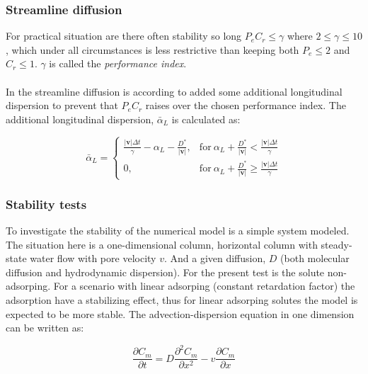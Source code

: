 \documentclass{report}
\begin{document}
\subsubsection{Streamline diffusion}

For practical situation are there often stability so long $P_eC_r\leq
 \gamma$ where $2\leq \gamma \leq 10$, \cite{Perrochet}  which under all
 circumstances is less restrictive than keeping both $P_e\leq 2$ and
 $C_r\leq 1$. $\gamma$ is called the \textit{performance index}.\\
\\
In the streamline diffusion is according to \cite{Perrochet} added
some additional longitudinal dispersion to prevent that $P_eC_r$
raises over the chosen performance index. The additional
longitudinal dispersion, $\bar{\alpha}_L$ is calculated as:

\begin{equation}
\bar{\alpha}_L=\begin{cases} \frac{|\mathbf{v}|\Delta
    t}{\gamma}-\alpha_L-\frac{D^{*}}{|\mathbf{v}|}, & \text{for} \ \alpha_L +
    \frac{D^{*}}{|\mathbf{v}|} < \frac{|\mathbf{v}|\Delta t}{\gamma}
 \\ 0, & \text{for} \ \alpha_L +
    \frac{D^{*}}{|\mathbf{v}|} \geq \frac{|\mathbf{v}|\Delta
    t}{\gamma}\end{cases}
\end{equation}



\subsubsection{Stability tests}

To investigate the stability of the numerical model is a simple system
 modeled. The situation here is a one-dimensional column, horizontal
 column with steady-state water flow with pore velocity $v$. And a given
diffusion, $D$ (both molecular diffusion and hydrodynamic
dispersion). For the present test is the solute non-adsorping. For a
scenario with linear adsorping (constant retardation factor) the
adsorption have a stabilizing effect, thus for linear adsorping solutes
the model is expected to be more stable. The advection-dispersion
equation in one dimension can be written as:

\begin{equation}
\frac{\partial C_m}{\partial t}=D\frac{\partial^2C_m}{\partial
  x^2}-v\frac{\partial C_m}{\partial x}
\end{equation}
\end{document}
